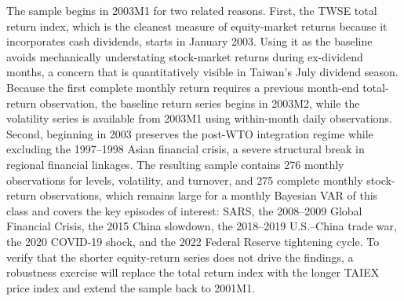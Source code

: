 \indent The sample begins in 2003M1 for two related reasons. First, the TWSE total return index, which is the cleanest measure of equity-market returns because it incorporates cash dividends, starts in January 2003. Using it as the baseline avoids mechanically understating stock-market returns during ex-dividend months, a concern that is quantitatively visible in Taiwan's July dividend season. Because the first complete monthly return requires a previous month-end total-return observation, the baseline return series begins in 2003M2, while the volatility series is available from 2003M1 using within-month daily observations. Second, beginning in 2003 preserves the post-WTO integration regime while excluding the 1997--1998 Asian financial crisis, a severe structural break in regional financial linkages. The resulting sample contains 276 monthly observations for levels, volatility, and turnover, and 275 complete monthly stock-return observations, which remains large for a monthly Bayesian VAR of this class and covers the key episodes of interest: SARS, the 2008--2009 Global Financial Crisis, the 2015 China slowdown, the 2018--2019 U.S.--China trade war, the 2020 COVID-19 shock, and the 2022 Federal Reserve tightening cycle. To verify that the shorter equity-return series does not drive the findings, a robustness exercise will replace the total return index with the longer TAIEX price index and extend the sample back to 2001M1.

